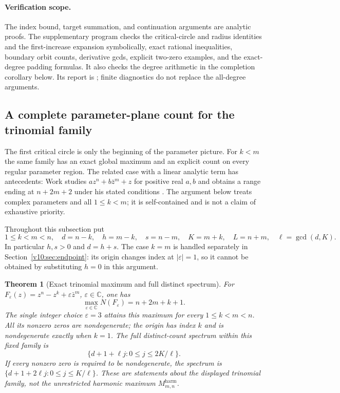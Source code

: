 \documentclass[UTF8,11pt]{ctexart}
\newtheorem{thm}{Theorem}[section]
\theoremstyle{definition}
\numberwithin{equation}{section}
\newcommand{\C}{\mathbb C}\newcommand{\R}{\mathbb R}
\begin{document}
\paragraph{Verification scope.}
The index bound, target summation, and continuation arguments are
analytic proofs. The supplementary program
 checks the critical-circle and
radius identities and the first-increase expansion symbolically,
exact rational inequalities, boundary orbit counts, derivative gcds,
explicit two-zero examples, and the exact-degree padding formulas.
It also checks the
degree arithmetic in the completion corollary below. Its report is
; finite diagnostics do
not replace the all-degree arguments.

\subsection{A complete parameter-plane count for the trinomial family}
\label{v9:sec:trinomialglobal}

The first critical circle is only the beginning of the parameter
picture. For $k<m$ the same family has an exact global maximum and
an explicit count on every regular parameter region. The related
case with a linear analytic term has antecedents: Work studies
$az^n+b\bar z^m+z$ for positive real $a,b$ and obtains a range
ending at $n+2m+2$ under his stated conditions \cite{Work21}.
The argument below treats complex parameters and all $1\le k<m$;
it is self-contained and is not a claim of exhaustive priority.

Throughout this subsection put
\[
 1\le k<m<n,\quad d=n-k,\quad h=m-k,\quad s=n-m,
 \quad K=m+k,\quad L=n+m,\quad \ell=\gcd(d,K).
\]
In particular $h,s>0$ and $d=h+s$. The case $k=m$ is handled separately in
Section~\ref{v10:sec:endpoint}: its origin changes index at
$|\varepsilon|=1$, so it cannot be obtained by substituting
$h=0$ in this argument.

\begin{thm}[Exact trinomial maximum and full distinct spectrum]
\label{v9:thm:trinomialmaximum}
For
$F_\varepsilon(z)=z^n-z^k+\varepsilon\bar z^m$,
$\varepsilon\in\C$, one has
\begin{equation}\label{v9:eq:trinomialmaximum}
 \max_{\varepsilon\in\C}N(F_\varepsilon)=n+2m+k+1.
\end{equation}
The single integer choice $\varepsilon=3$ attains this maximum
for every $1\le k<m<n$. All its nonzero zeros are nondegenerate;
the origin has index $k$ and is nondegenerate exactly when $k=1$.
The full distinct-count spectrum within this fixed family is
\begin{equation}\label{v9:eq:trinomialspectrum}
 \bigl\{d+1+\ell j:0\le j\le2K/\ell\bigr\}.
\end{equation}
If every nonzero zero is required to be nondegenerate, the spectrum is
$\{d+1+2\ell j:0\le j\le K/\ell\}$.
These are statements about the displayed trinomial family, not the
unrestricted harmonic maximum $M^{\mathrm{harm}}_{m,n}$.
\end{thm}
\end{document}
